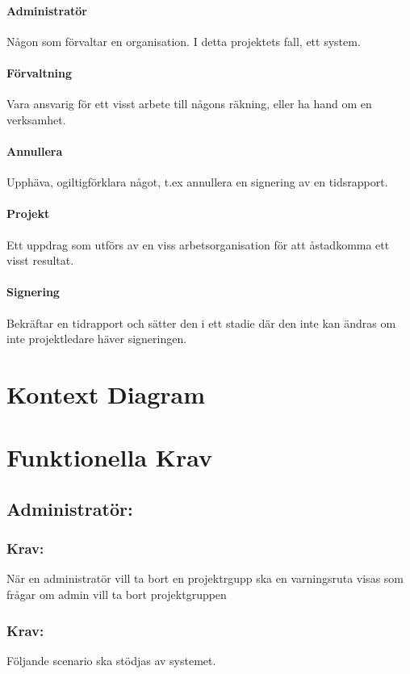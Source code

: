 \documentclass[paper=a4, fontsize=11pt,twoside]{article}
\begin{document}
\paragraph{Administratör}
\flushleft
Någon som förvaltar en organisation. I detta projektets fall, ett system.
\paragraph{Förvaltning}
\flushleft
Vara ansvarig för ett visst arbete till någons räkning, eller ha hand om en verksamhet.
\paragraph{Annullera}
\flushleft
Upphäva, ogiltigförklara något, t.ex annullera en signering av en tidsrapport.
\paragraph{Projekt}
\flushleft
Ett uppdrag som utförs av en viss arbetsorganisation för att åstadkomma ett visst resultat. 
\paragraph{Signering}
\flushleft
Bekräftar en tidrapport och sätter den i ett stadie där den inte kan ändras om inte projektledare häver signeringen.
\paragraph{}
\section{Kontext Diagram}

\section{Funktionella Krav}

\subsection{Administratör:}
\subsubsection*{Krav:}
När en administratör vill ta bort en projektrgupp ska en varningsruta visas som frågar om admin vill ta bort projektgruppen

\subsubsection*{Krav:} Följande scenario ska stödjas av systemet.
\end{document}
